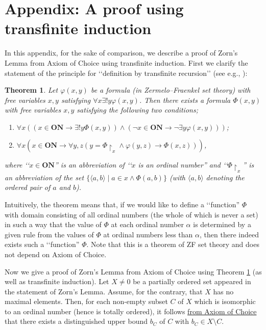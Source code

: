 \documentclass{article}
\newtheorem{theorem}{Theorem}
\begin{document}
\section*{Appendix: A proof using transfinite induction}

In this appendix, for the sake of comparison, we describe a proof of Zorn's Lemma from Axiom of Choice using transfinite induction.
First we clarify the statement of the principle for \lq\lq definition by transfinite recursion\rq\rq{} (see e.g., \cite[Chapter I, Theorem 9,3]{Kunen}):
\begin{theorem}
\label{thm:transfinite_induction}
Let $\varphi(x,y)$ be a formula (in Zermelo--Fraenkel set theory) with free variables $x,y$ satisfying $\forall x \exists! y \varphi(x,y)$.
Then there exists a formula $\Phi(x,y)$ with free variables $x,y$ satisfying the following two conditions;
\begin{enumerate}
\item $\forall x ( (x \in \mathbf{ON} \to \exists! y \Phi(x,y)) \land (\neg x \in \mathbf{ON} \to \neg\exists y \varphi(x,y) ) )$;
\item $\forall x ( x \in \mathbf{ON} \to \forall y,z ( y = \Phi\!\upharpoonright_x \land \varphi(y,z) \to \Phi(x,z) ) )$,
\end{enumerate}
where \lq\lq $x \in \mathbf{ON}$'' is an abbreviation of \lq\lq $x$ is an ordinal number'' and \lq\lq $\Phi\!\upharpoonright_x$'' is an abbreviation of the set $\{\langle a,b \rangle \mid a \in x \land \Phi(a,b)\}$ (with $\langle a,b \rangle$ denoting the ordered pair of $a$ and $b$).
\end{theorem}
Intuitively, the theorem means that, if we would like to define a \lq\lq function'' $\Phi$ with domain consisting of all ordinal numbers (the whole of which is never a set) in such a way that the value of $\Phi$ at each ordinal number $\alpha$ is determined by a given rule from the values of $\Phi$ at ordinal numbers less than $\alpha$, then there indeed exists such a \lq\lq function'' $\Phi$.
Note that this is a theorem of ZF set theory and does not depend on Axiom of Choice.

Now we give a proof of Zorn's Lemma from Axiom of Choice using Theorem \ref{thm:transfinite_induction} (as well as transfinite induction).
Let $X \neq 0$ be a partially ordered set appeared in the statement of Zorn's Lemma.
Assume, for the contrary, that $X$ has no maximal elements.
Then, for each non-empty subset $C$ of $X$ which is isomorphic to an ordinal number (hence is totally ordered), it follows \underline{from Axiom of Choice} that there exists a distinguished upper bound $b_C$ of $C$ with $b_C \in X \setminus C$.
\end{document}
